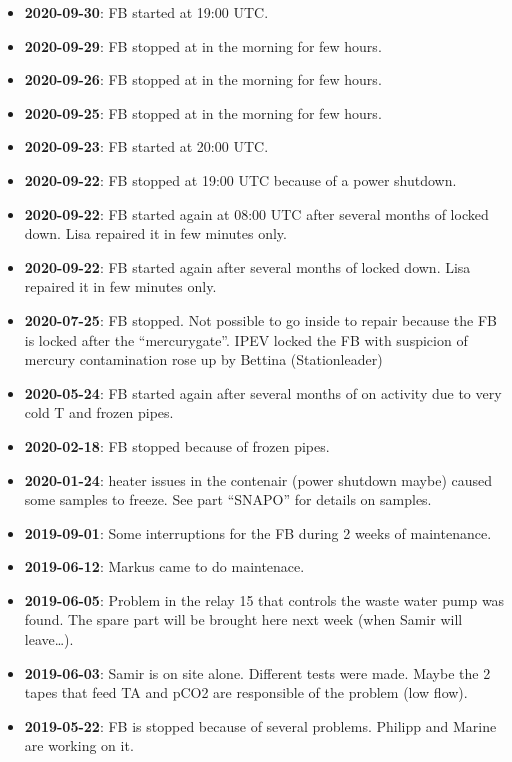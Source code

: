 \documentclass[
]{article}
\providecommand{\tightlist}{%
  \setlength{\itemsep}{0pt}\setlength{\parskip}{0pt}}
\begin{document}
\begin{itemize}
\tightlist
\item
  \textbf{2020-09-30}: FB started at 19:00 UTC.
\item
  \textbf{2020-09-29}: FB stopped at in the morning for few hours.
\item
  \textbf{2020-09-26}: FB stopped at in the morning for few hours.
\item
  \textbf{2020-09-25}: FB stopped at in the morning for few hours.
\item
  \textbf{2020-09-23}: FB started at 20:00 UTC.
\item
  \textbf{2020-09-22}: FB stopped at 19:00 UTC because of a power
  shutdown.
\item
  \textbf{2020-09-22}: FB started again at 08:00 UTC after several
  months of locked down. Lisa repaired it in few minutes only.
\item
  \textbf{2020-09-22}: FB started again after several months of locked
  down. Lisa repaired it in few minutes only.
\item
  \textbf{2020-07-25}: FB stopped. Not possible to go inside to repair
  because the FB is locked after the ``mercurygate''. IPEV locked the FB
  with suspicion of mercury contamination rose up by Bettina
  (Stationleader)
\item
  \textbf{2020-05-24}: FB started again after several months of on
  activity due to very cold T and frozen pipes.
\item
  \textbf{2020-02-18}: FB stopped because of frozen pipes.
\item
  \textbf{2020-01-24}: heater issues in the contenair (power shutdown
  maybe) caused some samples to freeze. See part ``SNAPO'' for details
  on samples.
\item
  \textbf{2019-09-01}: Some interruptions for the FB during 2 weeks of
  maintenance.
\item
  \textbf{2019-06-12}: Markus came to do maintenace.
\item
  \textbf{2019-06-05}: Problem in the relay 15 that controls the waste
  water pump was found. The spare part will be brought here next week
  (when Samir will leave\ldots).
\item
  \textbf{2019-06-03}: Samir is on site alone. Different tests were
  made. Maybe the 2 tapes that feed TA and pCO2 are responsible of the
  problem (low flow).
\item
  \textbf{2019-05-22}: FB is stopped because of several problems.
  Philipp and Marine are working on it.

\end{itemize}
\end{document}
